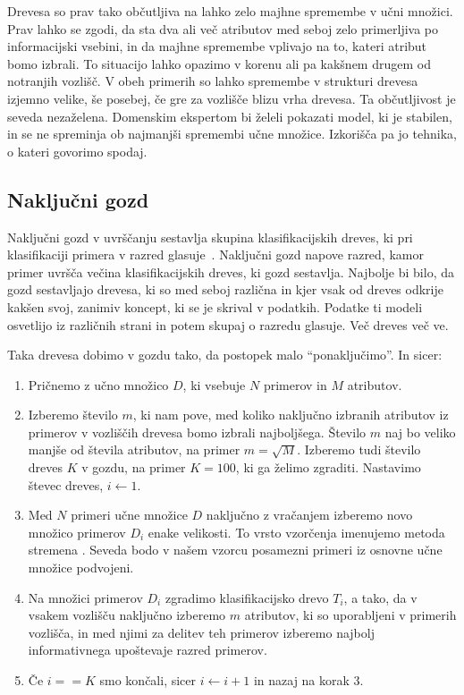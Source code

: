 Drevesa so prav tako občutljiva na lahko zelo majhne spremembe v učni množici. Prav lahko se zgodi, da sta dva ali več atributov med seboj zelo primerljiva po informacijski vsebini, in da majhne spremembe vplivajo na to, kateri atribut bomo izbrali. To situacijo lahko opazimo v korenu ali pa kakšnem drugem od notranjih vozlišč. V obeh primerih so lahko spremembe v strukturi drevesa izjemno velike, še posebej, če gre za vozlišče blizu vrha drevesa. Ta občutljivost je seveda nezaželena. Domenskim ekspertom bi želeli pokazati model, ki je stabilen, in se ne spreminja ob najmanjši spremembi učne množice. Izkorišča pa jo tehnika, o kateri govorimo spodaj.

\subsection{Naključni gozd}

Naključni gozd  v uvrščanju sestavlja skupina klasifikacijskih dreves, ki pri klasifikaciji primera v razred glasuje~\cite{}. Naključni gozd napove razred, kamor primer uvršča večina klasifikacijskih dreves, ki gozd sestavlja. Najbolje bi bilo, da gozd sestavljajo drevesa, ki so med seboj različna in kjer vsak od dreves odkrije kakšen svoj, zanimiv koncept, ki se je skrival v podatkih. Podatke ti modeli osvetlijo iz različnih strani in potem skupaj o razredu glasuje. Več dreves več ve.

Taka drevesa dobimo v gozdu tako, da postopek malo ``ponaključimo''. In sicer:
\begin{enumerate}
\item Pričnemo z učno množico $D$, ki vsebuje $N$ primerov in $M$ atributov.
\item Izberemo število $m$, ki nam pove, med koliko naključno izbranih atributov iz primerov v vozliščih drevesa bomo izbrali najboljšega. Število $m$ naj bo veliko manjše od števila atributov, na primer $m=\sqrt{M}$. Izberemo tudi število dreves $K$ v gozdu, na primer $K=100$, ki ga želimo zgraditi. Nastavimo števec dreves, $i\leftarrow 1$.
\item Med $N$ primeri učne množice $D$ naključno z vračanjem izberemo novo množico primerov $D_i$ enake velikosti. To vrsto vzorčenja imenujemo metoda stremena . Seveda bodo v našem vzorcu posamezni primeri iz osnovne učne množice podvojeni.
\item Na množici primerov $D_i$ zgradimo klasifikacijsko drevo $T_i$, a tako, da v vsakem vozlišču naključno izberemo $m$ atributov, ki so uporabljeni v primerih vozlišča, in med njimi za delitev teh primerov izberemo najbolj informativnega upoštevaje razred primerov.
\item Če $i==K$ smo končali, sicer $i\leftarrow i+1$ in nazaj na korak 3.
\end{enumerate}

